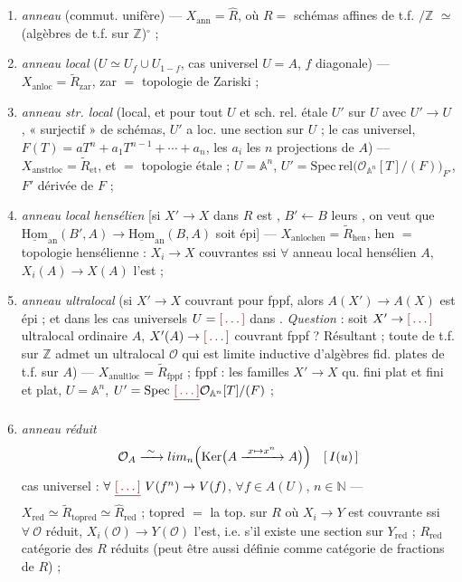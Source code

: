 \documentclass[11pt,a4paper]{article}
\begin{document}
\begin{enumerate}
  \item[1)] \emph{anneau} (commut. unifère) —
    $X_{\mathrm{ann}} = \hat{R}$, où $R = $ schémas affines de t.f. $/\mathbb{Z}$
    $\simeq$ (algèbres de t.f. sur $\mathbb{Z}$)$^{\circ}$ ;
  \item[2)] \emph{anneau local} ($U \simeq U_{f} \cup U_{1-f}$, cas
    universel $U = A$, $f$ diagonale) —
    $X_{\mathrm{anloc}} = \tilde{R}_{\mathrm{zar}}$, zar $=$ topologie de
    Zariski ;
  \item[4)] \emph{anneau str. local} (local, et pour tout $U$ et sch. rel.
    étale $U'$ sur $U$ avec $U' \to U$  , « surjectif » de schémas,  $U'$ a loc. une
    section sur $U$ ; \ill{} le cas universel,
    $F(T) = aT^{n} + a_{1}T^{n-1} + \cdots + a_{n}$, les $a_{i}$ les $n$
    projections de $A$) —
    $X_{\mathrm{anstrloc}} = \tilde{R}_{\mathrm{et}}$, et $=$ topologie étale ;
    $U = \mathbb{A}^{n}$, $U' = \mathrm{Spec}\ \mathrm{rel} 
    \bigl(\mathcal{O}_{\mathbb{A}^{n}}[T]/(F)\bigr)_{F'}$, $F'$ dérivée de $F$ ;
  \item[3)] \emph{anneau local hensélien} [si $X' \to X$ dans $R$ est
    \ill{} \ill{}, $B' \leftarrow B$ leurs \ill{}, on veut que
    $\underline{\mathrm{Hom}}_{\mathrm{an}}(B', A) \to
    \underline{\mathrm{Hom}}_{\mathrm{an}}(B, A)$ soit épi] —
    $X_{\mathrm{anlochen}} = \tilde{R}_{\mathrm{hen}}$, hen $=$ topologie
    hensélienne : $X_{i} \to X$ \ill{} couvrantes ssi $\forall$ anneau local
    hensélien $A$, $X_{i}(A) \to X(A)$ l'est ;
  \item[5)] \emph{anneau ultralocal} (si $X' \to X$ 
     couvrant pour fppf, alors $A(X') \to A(X)$ est épi ; \ill{} et
    dans les cas universels $U = \ill{}$ dans \ill{}. \emph{Question} :
    soit $X' \to \ill{}$ ultralocal ordinaire $A$, $X'(A) \to \ill{}$
    couvrant fppf ? Résultant \ill{} ; toute \ill{}  de t.f.
    \ill{} sur $\mathbb{Z}$ admet un \ill{} ultralocal $\mathcal{O}$ qui est
    limite inductive d'algèbres fid. plates de t.f. sur $A$) —
    $X_{\mathrm{anultloc}} = \tilde{R}_{\mathrm{fppf}}$ ; fppf : \ill{} les
    familles $X' \to X$ qu. fini plat et \ill{} fini et plat, $U =
    \mathbb{A}^{n}$, $U' = \mathrm{Spec}\ \struck{\ill{}} 
    \mathcal{O}_{\mathbb{A}^{n}}[T]/(F)$ ;
  \item[6)] \emph{anneau réduit}
    \[
      \mathcal{O}_{A} \xrightarrow{\ \sim\ }
      \varinjlim_{n} \Bigl(\mathrm{Ker}\bigl(A \xrightarrow{\ x \mapsto x^{n}\ }
      A\bigr)\Bigr) \quad [\, I(u) \,]
    \]
    cas universel : $\forall\ \struck{\ill{}}\ V(f^{n}) \to V(f)$,
    $\forall f \in A(U)$, $n \in \mathbb{N}$ —
    $X_{\mathrm{red}} \simeq \tilde{R}_{\mathrm{topred}} \simeq
    \hat{R}_{\mathrm{red}}$ ; topred $=$ la top. sur $R$ où $X_{i} \to Y$ est
    couvrante ssi $\forall\ \mathcal{O}$ réduit, $X_{i}(\mathcal{O}) \to
    Y(\mathcal{O})$ l'est, i.e. s'il existe une section sur $Y_{\mathrm{red}}$ ;
    $R_{\mathrm{red}}$ catégorie des \struck{\ill{}} $R$ réduits (peut être
    aussi définie comme catégorie de fractions de $R$) ;
\end{enumerate}
\end{document}
